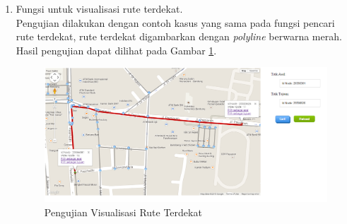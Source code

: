 \begin{enumerate}
  \item Fungsi untuk visualisasi rute terdekat.\\
  Pengujian dilakukan dengan contoh kasus yang sama pada fungsi pencari rute
  terdekat, rute terdekat digambarkan dengan \textit{polyline} berwarna
  merah. Hasil pengujian dapat dilihat pada Gambar \ref{fig:pu_visualrute}.
\begin{figure}[h]
\centering
\includegraphics[scale=0.45]{Gambar/pu_visualrute}
\caption[Pengujian Visualisasi Rute Terdekat]{Pengujian Visualisasi Rute
Terdekat}
\label{fig:pu_visualrute}
\end{figure}
\end{enumerate}

